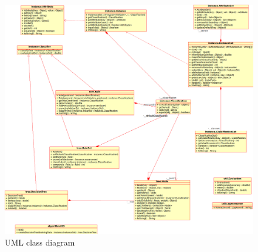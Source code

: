 \documentclass[10pt]{report}
\begin{document}
\begin{figure}
  \begin{center}
	\includegraphics[angle=90,width=\textwidth,height=!]{uml}
  \end{center}
  \caption{UML class diagram}
  \label{fig:uml}
\end{figure} 


%
%


\end{document}
